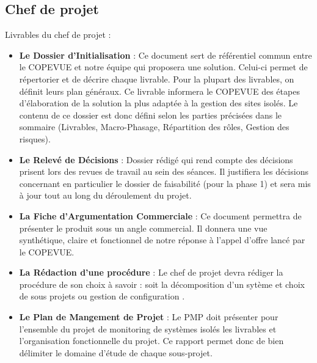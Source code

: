     \subsection{Chef de projet}
Livrables du chef de projet :
\begin{itemize}
\item \textbf{Le Dossier d'Initialisation} : Ce document sert de référentiel commun entre le COPEVUE et notre équipe qui proposera une solution. Celui-ci permet de répertorier et de décrire chaque livrable. Pour la plupart des livrables, on définit leurs plan généraux. Ce livrable informera le COPEVUE des étapes d’élaboration de la solution la plus adaptée à la gestion des sites isolés. Le contenu de ce dossier est donc défini selon les parties précisées dans le sommaire (Livrables, Macro-Phasage, Répartition des rôles, Gestion des risques).
\item \textbf{Le Relevé de Décisions} : Dossier rédigé qui rend compte des décisions prisent lors des revues de travail au sein des séances. Il justifiera les décisions concernant en particulier le dossier de faisabilité (pour la phase 1) et sera mis à jour tout au long du déroulement du projet.
\item \textbf{La Fiche d'Argumentation Commerciale} : Ce document permettra de présenter le produit sous un angle commercial. Il donnera une vue synthétique, claire et fonctionnel de notre réponse à l'appel d'offre lancé par le COPEVUE.
\item \textbf{La Rédaction d'une procédure} : Le chef de projet devra rédiger la procédure de son choix à savoir : soit la \og décomposition d'un sytème et choix de sous projets \fg ou \og gestion de configuration \fg.
\item \textbf{Le Plan de Mangement de Projet} : Le PMP doit présenter pour l'ensemble du projet de monitoring de systèmes isolés les livrables et l'organisation fonctionnelle du projet. Ce rapport permet donc de bien délimiter le domaine d'étude de chaque sous-projet.

\end{itemize}

